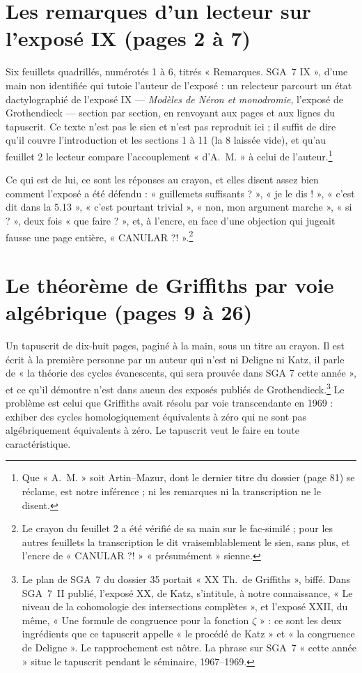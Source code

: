 \documentclass[11pt,a4paper]{article}
\begin{document}
\section*{Les remarques d'un lecteur sur l'exposé IX (pages 2 à 7)}

Six feuillets quadrillés, numérotés 1 à 6, titrés « Remarques. SGA~7 IX », d'une
main non identifiée qui tutoie l'auteur de l'exposé : un relecteur parcourt un
état dactylographié de l'exposé IX --- \emph{Modèles de Néron et monodromie},
l'exposé de Grothendieck --- section par section, en renvoyant aux pages et aux
lignes du tapuscrit. Ce texte n'est pas le sien et n'est pas reproduit ici ; il
suffit de dire qu'il couvre l'introduction et les sections 1 à 11 (la 8 laissée
vide), et qu'au feuillet 2 le lecteur compare l'accouplement « d'A.~M. » à celui de
l'auteur.\footnote{Que « A.~M. » soit Artin--Mazur, dont le dernier titre du
dossier (page 81) se réclame, est notre inférence ; ni les remarques ni la
transcription ne le disent.}

Ce qui est de lui, ce sont les réponses au crayon, et elles disent assez bien
comment l'exposé a été défendu : « guillemets suffisants ? », « je le dis ! »,
« c'est dit dans la 5.13 », « c'est pourtant trivial », « non, mon argument
marche », « si ? », deux fois « que faire ? », et, à l'encre, en face d'une
objection qui jugeait fausse une page entière, « CANULAR ?! ».\footnote{Le crayon
du feuillet 2 a été vérifié de sa main sur le fac-similé ; pour les autres
feuillets la transcription le dit vraisemblablement le sien, sans plus, et l'encre
de « CANULAR ?! » « présumément » sienne.}

\section*{Le théorème de Griffiths par voie algébrique (pages 9 à 26)}

Un tapuscrit de dix-huit pages, paginé à la main, sous un titre au crayon. Il est
écrit à la première personne par un auteur qui n'est ni Deligne ni Katz, il parle
de « la théorie des cycles évanescents, qui sera prouvée dans SGA 7 cette
année », et ce qu'il démontre n'est dans aucun des exposés publiés de
Grothendieck.\footnote{Le plan de SGA~7 du dossier 35 portait « XX Th.\ de
Griffiths », biffé. Dans SGA~7~II publié, l'exposé XX, de Katz, s'intitule, à
notre connaissance, « Le niveau de la cohomologie des intersections complètes »,
et l'exposé XXII, du même, « Une formule de congruence pour la fonction $\zeta$ » :
ce sont les deux ingrédients que ce tapuscrit appelle « le procédé de Katz » et
« la congruence de Deligne ». Le rapprochement est nôtre. La phrase sur SGA~7
« cette année » situe le tapuscrit pendant le séminaire, 1967--1969.} Le
problème est celui que Griffiths avait résolu par voie transcendante en 1969 :
exhiber des cycles homologiquement équivalents à zéro qui ne sont pas
algébriquement équivalents à zéro. Le tapuscrit veut le faire en toute
caractéristique.
\end{document}
